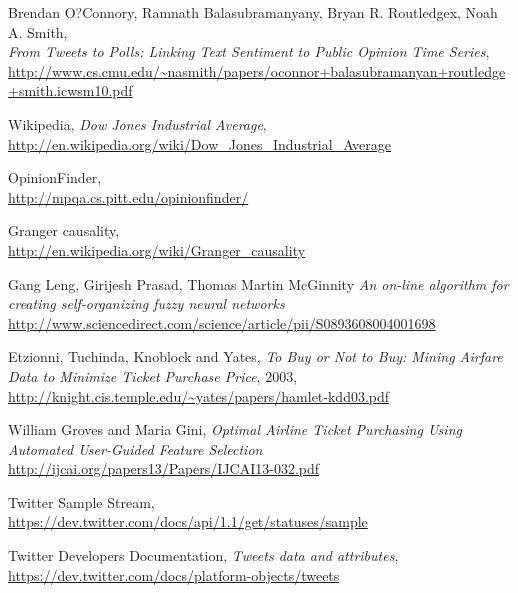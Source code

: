 \documentclass[minf,frontabs,twoside,singlespacing,parskip]{infthesis}
\begin{document}
\begin{thebibliography}{10}
	Brendan O?Connory,  Ramnath Balasubramanyany, Bryan R. Routledgex, Noah A. Smith, \\  
	\emph{From Tweets to Polls: Linking Text Sentiment to Public Opinion Time Series}, \\
	{\url{http://www.cs.cmu.edu/~nasmith/papers/oconnor+balasubramanyan+routledge+smith.icwsm10.pdf}}

	Wikipedia, \emph{Dow Jones Industrial Average}, \\
	{\url{http://en.wikipedia.org/wiki/Dow_Jones_Industrial_Average}}

	OpinionFinder, \\
	{\url{http://mpqa.cs.pitt.edu/opinionfinder/}}
	
	Granger causality, \\
	{\url{http://en.wikipedia.org/wiki/Granger_causality}}

	Gang Leng, Girijesh Prasad, Thomas Martin McGinnity
	\emph{An on-line algorithm for creating self-organizing fuzzy neural networks}
	{\url{http://www.sciencedirect.com/science/article/pii/S0893608004001698}}
  
 	Etzionni, Tuchinda, Knoblock and Yates, \emph{To Buy or Not to Buy: Mining Airfare Data to Minimize Ticket Purchase Price}, 2003, \\
  	{\url{http://knight.cis.temple.edu/~yates/papers/hamlet-kdd03.pdf}}
	
	William Groves and Maria Gini, \emph{Optimal Airline Ticket Purchasing Using Automated User-Guided Feature Selection} \\
	{\url{http://ijcai.org/papers13/Papers/IJCAI13-032.pdf}}

	Twitter Sample Stream, \\
	{\url{https://dev.twitter.com/docs/api/1.1/get/statuses/sample}}
	
	Twitter Developers Documentation, \emph{Tweets data and attributes},\\
	{\url{https://dev.twitter.com/docs/platform-objects/tweets}}

\end{thebibliography}
\end{document}
